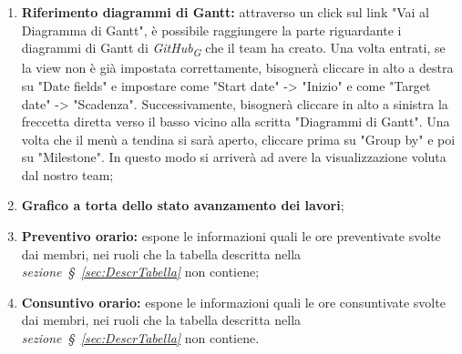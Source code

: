 \begin{enumerate}
    \item \textbf{Riferimento diagrammi di Gantt:} attraverso un click sul link "Vai al Diagramma di Gantt", è possibile raggiungere la parte riguardante i diagrammi di Gantt di \textit{GitHub}\textsubscript{\textit{G}} che il team ha creato. Una volta entrati, se la view non è già impostata correttamente, bisognerà cliccare in alto a destra su "Date fields" e impostare come "Start date" -> "Inizio" e come "Target date" -> "Scadenza". Successivamente, bisognerà cliccare in alto a sinistra la freccetta diretta verso il basso vicino alla scritta "Diagrammi di Gantt". Una volta che il menù a tendina si sarà aperto, cliccare prima su "Group by" e poi su "Milestone". In questo modo si arriverà ad avere la visualizzazione voluta dal nostro team;
    \item \textbf{Grafico a torta dello stato avanzamento dei lavori};
    \item \textbf{Preventivo orario:} espone le informazioni quali le ore preventivate svolte dai membri, nei ruoli che la tabella descritta nella \textit{sezione~\S~\ref{sec:DescrTabella}} non contiene; 
    \item \textbf{Consuntivo orario:} espone le informazioni quali le ore consuntivate svolte dai membri, nei ruoli che la tabella descritta nella \textit{sezione~\S~\ref{sec:DescrTabella}} non contiene. 
\end{enumerate}
